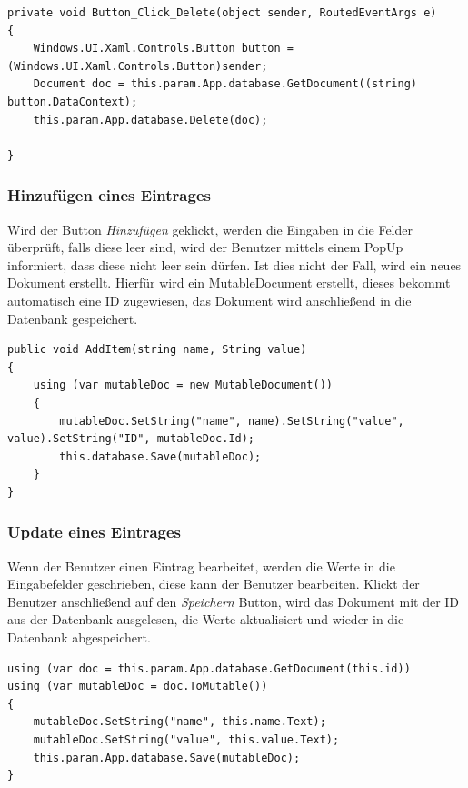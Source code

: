 \begin{verbatim}
private void Button_Click_Delete(object sender, RoutedEventArgs e)
{
	Windows.UI.Xaml.Controls.Button button = (Windows.UI.Xaml.Controls.Button)sender;
	Document doc = this.param.App.database.GetDocument((string) button.DataContext);
	this.param.App.database.Delete(doc);
	
}
\end{verbatim}

\subsubsection{Hinzufügen eines Eintrages}

Wird der Button \textit{Hinzufügen} geklickt, werden die Eingaben in die Felder überprüft, falls diese leer sind, wird der Benutzer mittels einem PopUp informiert, dass diese nicht leer sein dürfen. Ist dies nicht der Fall, wird ein neues Dokument erstellt. Hierfür wird ein MutableDocument erstellt, dieses bekommt automatisch eine ID zugewiesen, das Dokument wird anschließend in die Datenbank gespeichert. \cite{couchbasegettingstarted}

\begin{verbatim}
public void AddItem(string name, String value)
{
	using (var mutableDoc = new MutableDocument())
	{
		mutableDoc.SetString("name", name).SetString("value", value).SetString("ID", mutableDoc.Id);
		this.database.Save(mutableDoc);
	}
}
\end{verbatim}

\subsubsection{Update eines Eintrages}

Wenn der Benutzer einen Eintrag bearbeitet, werden die Werte in die Eingabefelder geschrieben, diese kann der Benutzer bearbeiten. Klickt der Benutzer anschließend auf den \textit{Speichern} Button, wird das Dokument mit der ID aus der Datenbank ausgelesen, die Werte aktualisiert und wieder in die Datenbank abgespeichert. \cite{couchbasegettingstarted}

\begin{verbatim}
using (var doc = this.param.App.database.GetDocument(this.id))
using (var mutableDoc = doc.ToMutable())
{
	mutableDoc.SetString("name", this.name.Text);
	mutableDoc.SetString("value", this.value.Text);
	this.param.App.database.Save(mutableDoc);
}
\end{verbatim}